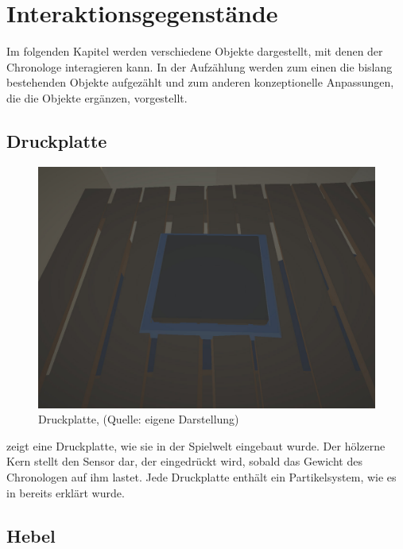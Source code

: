 \newpage
\section{Interaktionsgegenstände}
Im folgenden Kapitel werden verschiedene Objekte dargestellt, mit denen der Chronologe interagieren kann. In der Aufzählung werden zum einen die bislang bestehenden Objekte aufgezählt und zum anderen konzeptionelle Anpassungen, die die Objekte ergänzen, vorgestellt.

\subsection{Druckplatte}
\begin{figure}[ht]
\centering
\includegraphics[width=0.8\linewidth]{content/pictures/Pressureplate.jpg}
\caption{Druckplatte, (Quelle: eigene Darstellung)}
\label{fig:pressureplate_interactable}
\end{figure}

 zeigt eine Druckplatte, wie sie in der Spielwelt eingebaut wurde. Der hölzerne Kern stellt den Sensor dar, der eingedrückt wird, sobald das Gewicht des Chronologen auf ihm lastet. Jede Druckplatte enthält ein Partikelsystem, wie es in  bereits erklärt wurde.

\newpage
\subsection{Hebel}\label{sec:concept_interface_lever}

